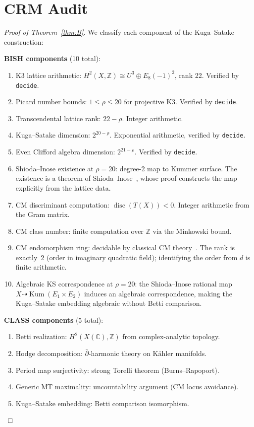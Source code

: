 \documentclass[11pt,a4paper]{article}
\theoremstyle{plain}
\theoremstyle{definition}
\newcommand{\Z}{\mathbb{Z}}
\newcommand{\C}{\mathbb{C}}
\DeclareMathOperator{\Kum}{Kum}
\DeclareMathOperator{\disc}{disc}
\begin{document}
\section{CRM Audit}\label{sec:crm-audit}

\begin{proof}[Proof of Theorem~\ref{thm:B}]
We classify each component of the Kuga--Satake construction:

\medskip
\noindent\textbf{BISH components} (10 total):
\begin{enumerate}[label=(B\arabic*)]
  \item K3 lattice arithmetic: $H^2(X,\Z) \cong U^3 \oplus E_8(-1)^2$, rank 22. Verified by \texttt{decide}.
  \item Picard number bounds: $1 \leq \rho \leq 20$ for projective K3. Verified by \texttt{decide}.
  \item Transcendental lattice rank: $22 - \rho$. Integer arithmetic.
  \item Kuga--Satake dimension: $2^{20-\rho}$. Exponential arithmetic, verified by \texttt{decide}.
  \item Even Clifford algebra dimension: $2^{21-\rho}$. Verified by \texttt{decide}.
  \item Shioda--Inose existence at $\rho = 20$: degree-2 map to Kummer surface. The existence is a theorem of Shioda--Inose~\cite{shioda-inose}, whose proof constructs the map explicitly from the lattice data.
  \item CM discriminant computation: $\disc(T(X)) < 0$. Integer arithmetic from the Gram matrix.
  \item CM class number: finite computation over $\Z$ via the Minkowski bound.
  \item CM endomorphism ring: decidable by classical CM theory~\cite{shimura-taniyama}. The rank is exactly~2 (order in imaginary quadratic field); identifying the order from $d$ is finite arithmetic.
  \item Algebraic KS correspondence at $\rho = 20$: the Shioda--Inose rational map $X \dashrightarrow \Kum(E_1 \times E_2)$ induces an algebraic correspondence, making the Kuga--Satake embedding algebraic without Betti comparison.
\end{enumerate}

\medskip
\noindent\textbf{CLASS components} (5 total):
\begin{enumerate}[label=(C\arabic*)]
  \item Betti realization: $H^2(X(\C), \Z)$ from complex-analytic topology.
  \item Hodge decomposition: $\bar{\partial}$-harmonic theory on K\"ahler manifolds.
  \item Period map surjectivity: strong Torelli theorem (Burns--Rapoport).
  \item Generic MT maximality: uncountability argument (CM locus avoidance).
  \item Kuga--Satake embedding: Betti comparison isomorphism.
\end{enumerate}


\end{proof}
\end{document}
